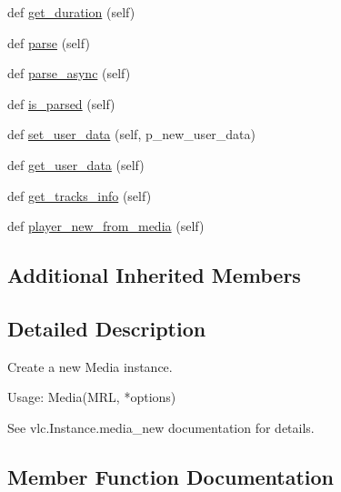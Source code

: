 \begin{DoxyCompactItemize}
\item 
def \hyperlink{classsrc_1_1lib_1_1vlc_1_1Media_a8b9ea7e9b8c5d1d49c3f87e496494c0f}{get\+\_\+duration} (self)
\item 
def \hyperlink{classsrc_1_1lib_1_1vlc_1_1Media_a3bf0f5d50d043aef62ebbd9173dc25c5}{parse} (self)
\item 
def \hyperlink{classsrc_1_1lib_1_1vlc_1_1Media_a12d7450b2a71bea1c2b0251fafee6eb3}{parse\+\_\+async} (self)
\item 
def \hyperlink{classsrc_1_1lib_1_1vlc_1_1Media_af04498262d9b6173eb8fa008552f8704}{is\+\_\+parsed} (self)
\item 
def \hyperlink{classsrc_1_1lib_1_1vlc_1_1Media_ac67742341c5217ad70b0be368746c123}{set\+\_\+user\+\_\+data} (self, p\+\_\+new\+\_\+user\+\_\+data)
\item 
def \hyperlink{classsrc_1_1lib_1_1vlc_1_1Media_ade1cf3e752cb5b5428212da0ef571455}{get\+\_\+user\+\_\+data} (self)
\item 
def \hyperlink{classsrc_1_1lib_1_1vlc_1_1Media_a307cc1bbba06fc994594932773c1187e}{get\+\_\+tracks\+\_\+info} (self)
\item 
def \hyperlink{classsrc_1_1lib_1_1vlc_1_1Media_aacfd8f6c83566c722683013860fa064c}{player\+\_\+new\+\_\+from\+\_\+media} (self)
\end{DoxyCompactItemize}
\subsection*{Additional Inherited Members}


\subsection{Detailed Description}
\begin{DoxyVerb}Create a new Media instance.

Usage: Media(MRL, *options)

See vlc.Instance.media_new documentation for details.\end{DoxyVerb}
 

\subsection{Member Function Documentation}
\hypertarget{classsrc_1_1lib_1_1vlc_1_1Media_a142ae131a221b149de9bc798e9f076f4}{}
